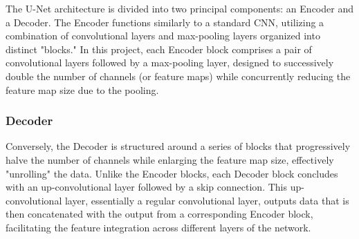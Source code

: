 \documentclass[12pt]{article}
\begin{document}
The U-Net architecture is divided into two principal components: an Encoder and a Decoder. The Encoder functions similarly to a standard CNN, utilizing a combination of convolutional layers and max-pooling layers organized into distinct "blocks." In this project, each Encoder block comprises a pair of convolutional layers followed by a max-pooling layer, designed to successively double the number of channels (or feature maps) while concurrently reducing the feature map size due to the pooling.

\subsubsection*{Decoder}

Conversely, the Decoder is structured around a series of blocks that progressively halve the number of channels while enlarging the feature map size, effectively "unrolling" the data. Unlike the Encoder blocks, each Decoder block concludes with an up-convolutional layer followed by a skip connection. This up-convolutional layer, essentially a regular convolutional layer, outputs data that is then concatenated with the output from a corresponding Encoder block, facilitating the feature integration across different layers of the network.



\end{document}
